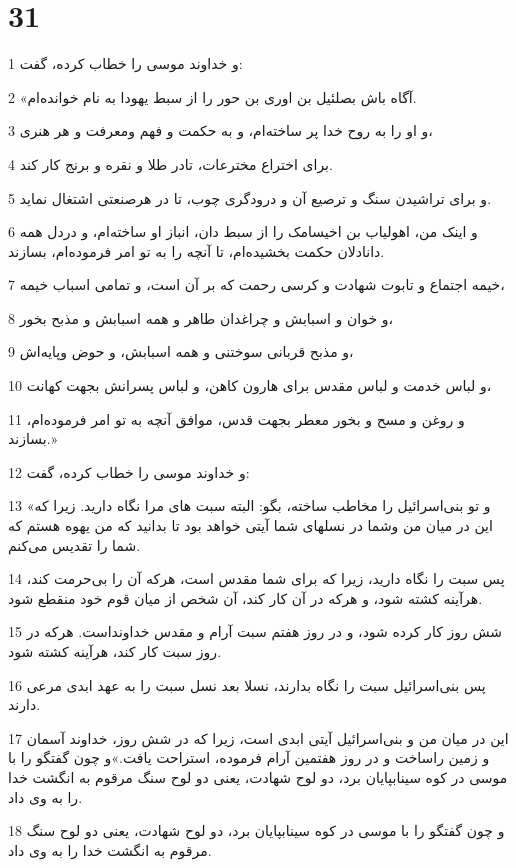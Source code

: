 \chapter{31}

\par 1 و خداوند موسی را خطاب کرده، گفت:
\par 2 «آگاه باش بصلئیل بن اوری بن حور را از سبط یهودا به نام خوانده‌ام.
\par 3 و او را به روح خدا پر ساخته‌ام، و به حکمت و فهم ومعرفت و هر هنری،
\par 4 برای اختراع مخترعات، تادر طلا و نقره و برنج کار کند.
\par 5 و برای تراشیدن سنگ و ترصیع آن و درودگری چوب، تا در هرصنعتی اشتغال نماید.
\par 6 و اینک من، اهولیاب بن اخیسامک را از سبط دان، انباز او ساخته‌ام، و دردل همه دانادلان حکمت بخشیده‌ام، تا آنچه را به تو امر فرموده‌ام، بسازند.
\par 7 خیمه اجتماع و تابوت شهادت و کرسی رحمت که بر آن است، و تمامی اسباب خیمه،
\par 8 و خوان و اسبابش و چراغدان طاهر و همه اسبابش و مذبح بخور،
\par 9 و مذبح قربانی سوختنی و همه اسبابش، و حوض وپایه‌اش،
\par 10 و لباس خدمت و لباس مقدس برای هارون کاهن، و لباس پسرانش بجهت کهانت،
\par 11 و روغن و مسح و بخور معطر بجهت قدس، موافق آنچه به تو امر فرموده‌ام، بسازند.»
\par 12 و خداوند موسی را خطاب کرده، گفت:
\par 13 «و تو بنی‌اسرائیل را مخاطب ساخته، بگو: البته سبت های مرا نگاه دارید. زیرا که این در میان من وشما در نسلهای شما آیتی خواهد بود تا بدانید که من یهوه هستم که شما را تقدیس می‌کنم.
\par 14 پس سبت را نگاه دارید، زیرا که برای شما مقدس است، هر‌که آن را بی‌حرمت کند، هرآینه کشته شود، و هر‌که در آن کار کند، آن شخص از میان قوم خود منقطع شود.
\par 15 شش روز کار کرده شود، و در روز هفتم سبت آرام و مقدس خداونداست. هر‌که در روز سبت کار کند، هرآینه کشته شود.
\par 16 پس بنی‌اسرائیل سبت را نگاه بدارند، نسلا بعد نسل سبت را به عهد ابدی مرعی دارند.
\par 17 این در میان من و بنی‌اسرائیل آیتی ابدی است، زیرا که در شش روز، خداوند آسمان و زمین راساخت و در روز هفتمین آرام فرموده، استراحت یافت.»و چون گفتگو را با موسی در کوه سینابپایان برد، دو لوح شهادت، یعنی دو لوح سنگ مرقوم به انگشت خدا را به وی داد.
\par 18 و چون گفتگو را با موسی در کوه سینابپایان برد، دو لوح شهادت، یعنی دو لوح سنگ مرقوم به انگشت خدا را به وی داد.
 
